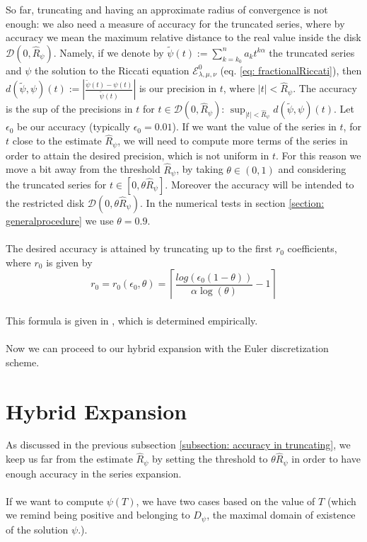 \documentclass[a4paper,italian,11pt]{book}
\theoremstyle{plain}
\theoremstyle{remark}
\theoremstyle{plain}
\begin{document}
So far, truncating and having an approximate radius of convergence is not enough: 
we also need a measure of accuracy for the truncated series, where by accuracy we mean the maximum relative distance to the real value inside the disk $\mathcal{D}(0,\widehat{R}_\psi)$. Namely, if we denote by $\tilde{\psi}(t) := \sum_{k = k_0}^n a_k t^{k\alpha}$ the truncated series and $\psi$ the solution to the Riccati equation $\mathcal{E}^0_{\lambda, \mu, \nu}$ (eq. \eqref{eq: fractionalRiccati}), then $d(\tilde{\psi}, \psi)(t) := 
\left| \frac{\tilde{\psi}(t)- \psi(t)}{\tilde{\psi}(t)} \right| $ is our precision in $t$, where $|t| < \widehat{R}_\psi$. The accuracy is the sup of the precisions in $t$ for $t\in \mathcal{D}(0,\widehat{R}_\psi)$: $\sup_{|t| < \widehat{R}_\psi}d(\tilde{\psi}, \psi)(t) $. Let $\epsilon_0$ be our accuracy (typically $\epsilon_0 = 0.01$).
If we want the value of the series in $t$, for $t$ close to the estimate $\widehat{R}_\psi$, we will need to compute more terms of the series in order to attain the desired precision, which is not uniform in $t$. For this reason we move a bit away from the threshold $\widehat{R}_\psi$, by taking $\theta \in (0,1)$ and considering the truncated series for $t\in [0, \theta \widehat{R}_\psi].$ Moreover the accuracy will be intended to the restricted disk $\mathcal{D}(0,\theta \widehat{R}_\psi )$. In the numerical tests in section \ref{section: generalprocedure} we use $\theta = 0.9$.
\\
\\
The desired accuracy is attained by truncating up to the first  $r_0$ coefficients, where $r_0$ is given by
\begin{equation}
    \label{eq: accuracyTruncation}
    r_0 = r_0(\epsilon_0, \theta) = \left\lceil \frac{log(\epsilon_0 (1-\theta))}{ \alpha \log (\theta)}  -1  \right\rceil
\end{equation}
\\
This formula is given in \cite{Main}, which is determined empirically.
\\
\\
Now we can proceed to our hybrid expansion with the Euler discretization scheme.

\section{Hybrid Expansion}
\label{section: hybrid expansion threshold}

As discussed in the previous subsection \ref{subsection: accuracy in truncating}, we keep us far from the estimate $\widehat{R}_\psi$ by setting the threshold to $\theta \widehat{R}_\psi$ in order to have enough accuracy in the series expansion. 
\\\
\\
If we want to compute $\psi(T)$, we have two cases based on the value of $T$ (which we remind being positive and belonging to $D_\psi$, the maximal domain of existence of the solution $\psi$.). 
\end{document}
